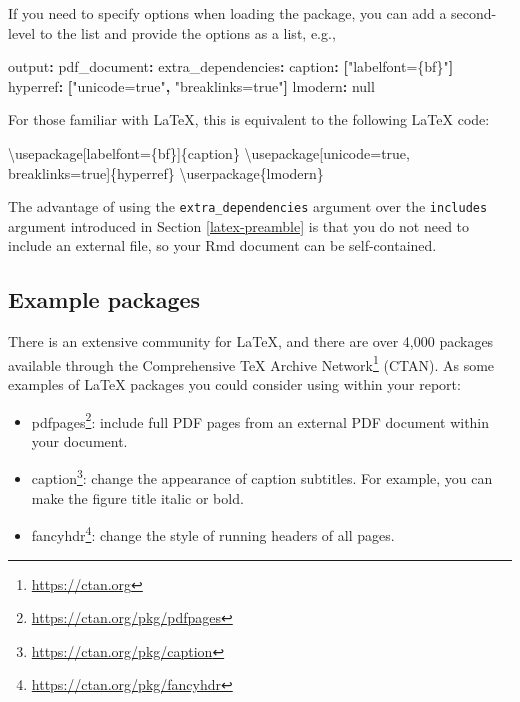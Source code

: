 \documentclass[
  11pt,
]{krantz}
\newenvironment{Shaded}{\begin{snugshade}}{\end{snugshade}}
\newcommand{\AttributeTok}[1]{\textcolor[rgb]{0.61,0.61,0.61}{#1}}
\newcommand{\BuiltInTok}[1]{#1}
\newcommand{\CharTok}[1]{\textcolor[rgb]{0.5,0.5,0.5}{#1}}
\newcommand{\ExtensionTok}[1]{#1}
\newcommand{\FunctionTok}[1]{\textcolor[rgb]{0,0,0}{#1}}
\newcommand{\KeywordTok}[1]{\textcolor[rgb]{0.27,0.27,0.27}{\textbf{#1}}}
\newcommand{\NormalTok}[1]{#1}
\newcommand{\StringTok}[1]{\textcolor[rgb]{0.5,0.5,0.5}{#1}}
\providecommand{\tightlist}{%
  \setlength{\itemsep}{0pt}\setlength{\parskip}{0pt}}
\renewcommand{\href}[2]{#2\footnote{\url{#1}}}
\begin{document}
If you need to specify options when loading the package, you can add a second-level to the list and provide the options as a list, e.g.,

\begin{Shaded}
\begin{Highlighting}[]
\FunctionTok{output}\KeywordTok{:}\AttributeTok{ }
\AttributeTok{  }\FunctionTok{pdf_document}\KeywordTok{:}
\AttributeTok{    }\FunctionTok{extra_dependencies}\KeywordTok{:}
\AttributeTok{      }\FunctionTok{caption}\KeywordTok{:}\AttributeTok{ }\KeywordTok{[}\StringTok{"labelfont=\{bf\}"}\KeywordTok{]}
\AttributeTok{      }\FunctionTok{hyperref}\KeywordTok{:}\AttributeTok{ }\KeywordTok{[}\StringTok{"unicode=true"}\KeywordTok{,}\AttributeTok{ }\StringTok{"breaklinks=true"}\KeywordTok{]}
\AttributeTok{      }\FunctionTok{lmodern}\KeywordTok{:}\AttributeTok{ }\CharTok{null}
\end{Highlighting}
\end{Shaded}

For those familiar with LaTeX, this is equivalent to the following LaTeX code:

\begin{Shaded}
\begin{Highlighting}[]
\BuiltInTok{\textbackslash{}usepackage}\NormalTok{[labelfont=\{bf\}]\{}\ExtensionTok{caption}\NormalTok{\} }
\BuiltInTok{\textbackslash{}usepackage}\NormalTok{[unicode=true, breaklinks=true]\{}\ExtensionTok{hyperref}\NormalTok{\}}
\FunctionTok{\textbackslash{}userpackage}\NormalTok{\{lmodern\}}
\end{Highlighting}
\end{Shaded}

The advantage of using the \texttt{extra\_dependencies} argument over the \texttt{includes} argument introduced in Section \ref{latex-preamble} is that you do not need to include an external file, so your Rmd document can be self-contained.

\hypertarget{example-packages}{%
\subsection{Example packages}\label{example-packages}}

There is an extensive community for LaTeX, and there are over 4,000 packages available through the \href{https://ctan.org}{Comprehensive TeX Archive Network} (CTAN). As some examples of LaTeX packages you could consider using within your report:

\begin{itemize}
\tightlist
\item
  \href{https://ctan.org/pkg/pdfpages}{pdfpages}: include full PDF pages from an external PDF document within your document.
\item
  \href{https://ctan.org/pkg/caption}{caption}: change the appearance of caption subtitles. For example, you can make the figure title italic or bold.
\item
  \href{https://ctan.org/pkg/fancyhdr}{fancyhdr}: change the style of running headers of all pages.
\end{itemize}
\end{document}
